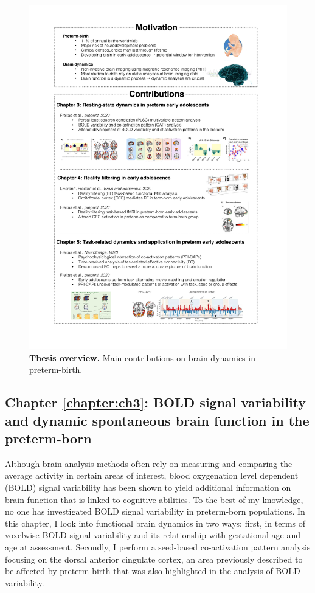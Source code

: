\begin{figure}[h!]
\centering\includegraphics[width=0.95\linewidth]{images/Ch1/Overview.pdf}
\caption{\textbf{Thesis overview.} Main contributions on brain dynamics in preterm-birth. } \label{fig:overview}
\end{figure}


\subsection*{Chapter \ref{chapter:ch3}: BOLD signal variability and dynamic spontaneous brain function in the preterm-born}
Although brain analysis methods often rely on measuring and comparing the average activity in certain areas of interest, blood oxygenation level dependent (BOLD) signal variability has been shown to yield additional information on brain function that is linked to cognitive abilities.
To the best of my knowledge, no one has investigated BOLD signal variability in preterm-born populations. In this chapter, I look into functional brain dynamics in two ways: first, in terms of voxelwise BOLD signal variability and its relationship with gestational age and age at assessment. Secondly, I perform a seed-based co-activation pattern analysis focusing on the dorsal anterior cingulate cortex, an area previously described to be affected by preterm-birth \citep{White2014,Daamen2015,Lordier2019} that was also highlighted in the analysis of BOLD variability. 

